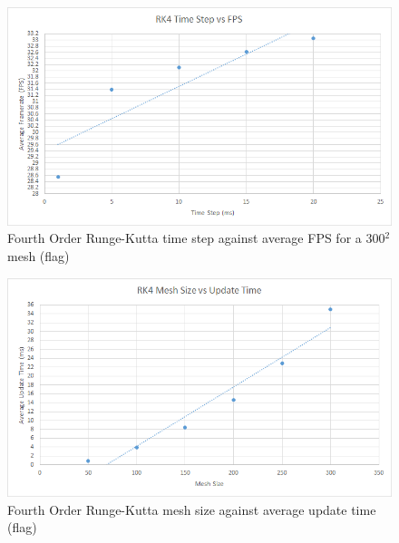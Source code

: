     \begin{figure}
    \begin{center}
      \includegraphics[scale=.9]{Figures/flag_rk4_ts_fps}
    \end{center}
    \caption{Fourth Order Runge-Kutta time step against average FPS for a 300$^{2}$ mesh (flag)}
    \label{fig:rk4 step fps flag}
  \end{figure}
  
    \begin{figure}
    \begin{center}
      \includegraphics[scale=.9]{Figures/flag_rk4_m_ut}
    \end{center}
    \caption{Fourth Order Runge-Kutta mesh size against average update time (flag)}
    \label{fig:rk4 mesh update flag}
  \end{figure}
  
